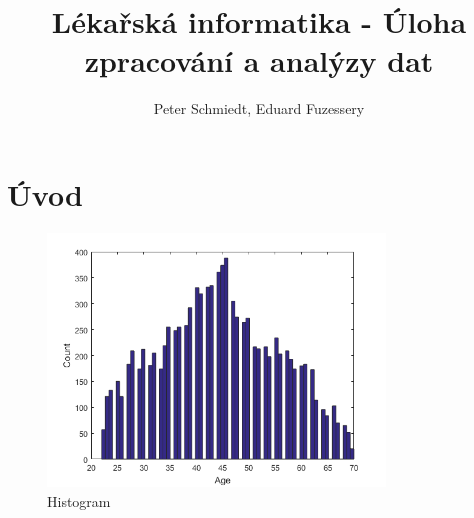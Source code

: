 \documentclass[11pt]{article}
\author{Peter Schmiedt, Eduard Fuzessery}
\title{Lékařská informatika - Úloha zpracování a analýzy dat}
\begin{document}
\begin{titlepage}
	\maketitle
\end{titlepage}



\section{Úvod}

\begin{figure}[h!]
  \caption{Histogram}
  \centering
    \includegraphics[width=0.8\textwidth]{ages.png}
\end{figure}
\end{document}
